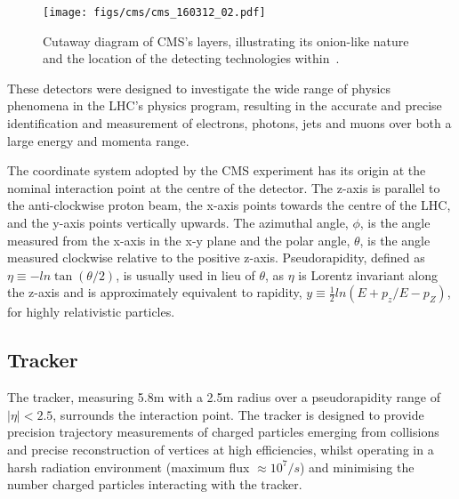 \begin{figure}[htb]
\begin{center}
\texttt{[image: figs/cms/cms\_160312\_02.pdf]}
\caption{Cutaway diagram of CMS’s layers, illustrating its onion-like nature and the location of the detecting technologies within~\cite{Sakuma:2013jqa}.}
\label{fig:cms-cutaway}
\end{center}
\end{figure}

These detectors were designed to investigate the wide range of physics phenomena in the LHC's physics program, resulting in the accurate and precise identification and measurement of electrons, photons, jets and muons over both a large energy and momenta range.

The coordinate system adopted by the CMS experiment has its origin at the nominal interaction point at the centre of the detector. 
The z-axis is parallel to the anti-clockwise proton beam, the x-axis points towards the centre of the LHC, and the y-axis points vertically upwards.
The azimuthal angle, $\phi$, is the angle measured from the x-axis in the x-y plane and the polar angle, $\theta$, is the angle measured clockwise relative to the positive z-axis.
Pseudorapidity, defined as $\eta \equiv -ln\tan(\theta/2)$, is usually used in lieu of $\theta$, as $\eta$ is Lorentz invariant along the z-axis and is approximately equivalent to rapidity, $y \equiv \frac{1}{2} ln(E+p_{z}/E-p_{Z})$, for highly relativistic particles. 

\subsection{Tracker}\label{subsec:tracker}
The tracker, measuring 5.8m with a 2.5m radius over a pseudorapidity range of $|\eta| < 2.5$, surrounds the interaction point.
The tracker is designed to provide precision trajectory measurements of charged particles emerging from collisions and precise reconstruction of vertices at high efficiencies, whilst operating in a harsh radiation environment (maximum flux $\approx 10^{7}/s$) and minimising the number charged particles interacting with the tracker.

